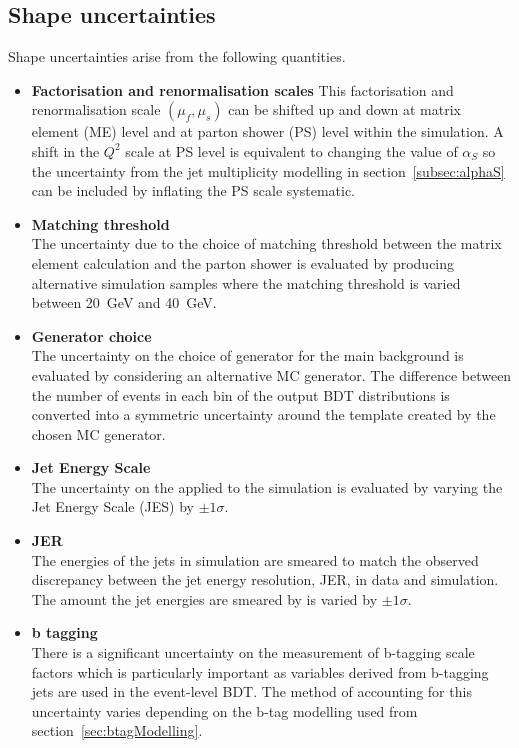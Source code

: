 \subsection{Shape uncertainties}
 Shape uncertainties arise from the following quantities.
\begin{itemize}
\item \textbf{Factorisation and renormalisation scales}
This factorisation and renormalisation scale $\left(\mu_{f},\mu_{s}\right)$ can be shifted up and down at matrix element (ME) level and at parton shower (PS) level within the simulation. A shift in the $Q^{2}$ scale at PS level is equivalent to changing the value of $\alpha_{S}$ so the uncertainty from the jet multiplicity modelling in section~\ref{subsec:alphaS} can be included by inflating the PS scale systematic.

\item \textbf{Matching threshold}\\
The uncertainty due to the choice of matching threshold between the matrix element calculation and the parton shower is evaluated by producing alternative simulation samples where the matching threshold is varied between 20~GeV and 40~GeV.

\item \textbf{Generator choice}\\
The uncertainty on the choice of generator for the main \ttbar background is evaluated by considering an alternative \ttbar MC generator. The difference between the number of events in each bin of the output BDT distributions is converted into a symmetric uncertainty around the template created by the chosen MC generator.

\item \textbf{Jet Energy Scale}\\
The uncertainty on the  applied to the simulation is evaluated by varying the Jet Energy Scale (JES) by $\pm 1\sigma$.

\item \textbf{JER}\\
The energies of the jets in simulation are smeared to match the observed discrepancy between the jet energy resolution, JER, in data and simulation. The amount the jet energies are smeared by is varied by $\pm 1\sigma$.

\item \textbf{b tagging}\\
There is a significant uncertainty on the measurement of b-tagging scale factors which is particularly important as variables derived from b-tagging jets are used in the event-level BDT. The method of accounting for this uncertainty varies depending on the b-tag modelling used from section~\ref{sec:btagModelling}.


\end{itemize}
